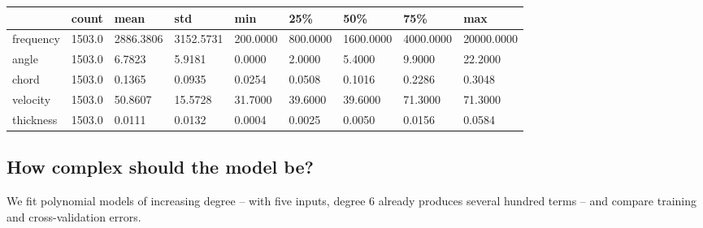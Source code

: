 \documentclass[
  letterpaper,
  DIV=11,
  numbers=noendperiod]{scrreprt}
\begin{document}
\begin{longtable}[]{@{}lllllllll@{}}
\toprule\noalign{}
& count & mean & std & min & 25\% & 50\% & 75\% & max \\
\midrule\noalign{}
\endhead
\bottomrule\noalign{}
\endlastfoot
frequency & 1503.0 & 2886.3806 & 3152.5731 & 200.0000 & 800.0000 &
1600.0000 & 4000.0000 & 20000.0000 \\
angle & 1503.0 & 6.7823 & 5.9181 & 0.0000 & 2.0000 & 5.4000 & 9.9000 &
22.2000 \\
chord & 1503.0 & 0.1365 & 0.0935 & 0.0254 & 0.0508 & 0.1016 & 0.2286 &
0.3048 \\
velocity & 1503.0 & 50.8607 & 15.5728 & 31.7000 & 39.6000 & 39.6000 &
71.3000 & 71.3000 \\
thickness & 1503.0 & 0.0111 & 0.0132 & 0.0004 & 0.0025 & 0.0050 & 0.0156
& 0.0584 \\
\end{longtable}

\subsection{How complex should the model
be?}\label{how-complex-should-the-model-be}

We fit polynomial models of increasing degree -- with five inputs,
degree 6 already produces several hundred terms -- and compare training
and cross-validation errors.
\end{document}
